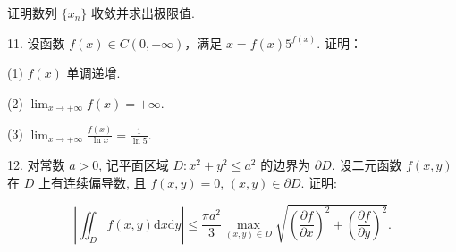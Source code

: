\documentclass{examcollection}
\renewcommand{\displayformula}[1]{\[#1\]}
\begin{document}
{\begin{minipage}{\textwidth}
证明数列 $\{x_{n}\}$ 收敛并求出极限值.\par
11. 设函数 $f(x) \in C(0, +\infty)$，满足 $x = f(x)5^{f(x)}$. 证明：\par
(1) $f(x)$ 单调递增.\par
(2) $\lim_{x\to +\infty}f(x) = +\infty .$\par
(3) $\lim_{x\to +\infty}\frac{f(x)}{\ln x} = \frac{1}{\ln 5}.$\par
12. 对常数 $a > 0$, 记平面区域 $D: x^2 + y^2 \leq a^2$ 的边界为 $\partial D$. 设二元函数 $f(x, y)$ 在 $D$ 上有连续偏导数, 且 $f(x, y) = 0$, $(x, y) \in \partial D$. 证明:\par
\displayformula{\left| \iint_ {D} f (x, y) \mathrm{d} x \mathrm{d} y \right| \leq \frac {\pi a ^ {2}}{3} \max _ {(x, y) \in D} \sqrt {\left(\frac {\partial f}{\partial x}\right) ^ {2} + \left(\frac {\partial f}{\partial y}\right) ^ {2}}.}\par
\end{minipage}}
\ifdim\dimexpr\ht\proofbox+\dp\proofbox\relax>\textheight
\noindent\resizebox{!}{\textheight}{\usebox{\proofbox}}\else\noindent\usebox{\proofbox}\fi\clearpage
\end{document}
